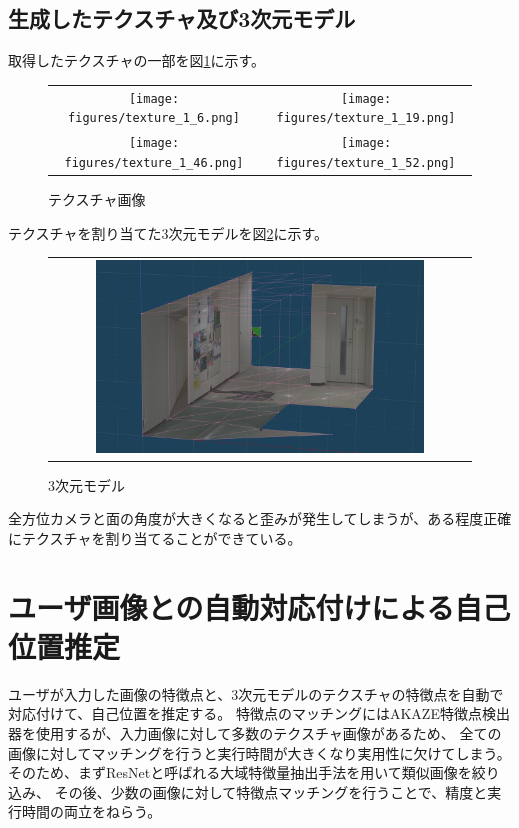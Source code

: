 \documentclass[]{jarticle}          %
\begin{document}
\subsection{生成したテクスチャ及び3次元モデル}
取得したテクスチャの一部を図\ref{four}に示す。
\begin{figure}[H]
  \begin{center}
    \begin{tabular}{cc}
      \texttt{[image: figures/texture\_1\_6.png]}&
      \texttt{[image: figures/texture\_1\_19.png]}\\
      \texttt{[image: figures/texture\_1\_46.png]}&
      \texttt{[image: figures/texture\_1\_52.png]}\\
    \end{tabular}
  \end{center}
  \caption{テクスチャ画像}
  \label{four}
\end{figure}
テクスチャを割り当てた3次元モデルを図\ref{five}に示す。
\begin{figure}[H]
  \begin{center}
    \begin{tabular}{c}
      \includegraphics[width=0.8\textwidth]{figures/3dmodel.png}
    \end{tabular}
  \end{center}
  \caption{3次元モデル}
  \label{five}
\end{figure}
全方位カメラと面の角度が大きくなると歪みが発生してしまうが、ある程度正確にテクスチャを割り当てることができている。

\section{ユーザ画像との自動対応付けによる自己位置推定}
ユーザが入力した画像の特徴点と、3次元モデルのテクスチャの特徴点を自動で対応付けて、自己位置を推定する。
特徴点のマッチングにはAKAZE特徴点検出器を使用するが、入力画像に対して多数のテクスチャ画像があるため、
全ての画像に対してマッチングを行うと実行時間が大きくなり実用性に欠けてしまう。
そのため、まずResNetと呼ばれる大域特徴量抽出手法を用いて類似画像を絞り込み、
その後、少数の画像に対して特徴点マッチングを行うことで、精度と実行時間の両立をねらう。
\end{document}
